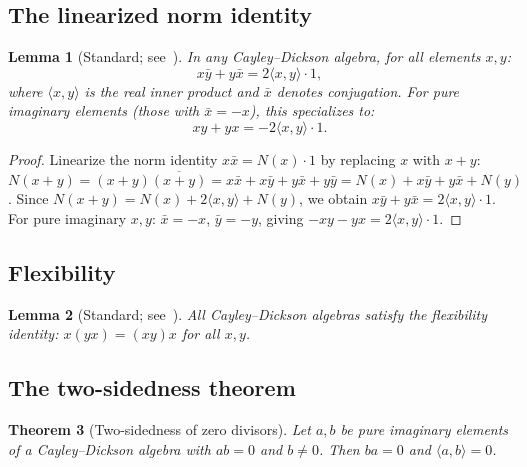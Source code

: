 \documentclass[12pt,a4paper]{article}
\newtheorem{theorem}{Theorem}[section]
\newtheorem{lemma}[theorem]{Lemma}
\theoremstyle{definition}
\theoremstyle{remark}
\begin{document}
\subsection{The linearized norm identity}

\begin{lemma}[Standard; see~\cite{Schafer1966}]
\label{lem:linearized-norm}
In any Cayley--Dickson algebra, for all elements $x, y$:
\[
  x\bar{y} + y\bar{x} = 2\langle x, y \rangle \cdot 1,
\]
where $\langle x, y \rangle$ is the real inner product and
$\bar{x}$ denotes conjugation. For pure imaginary elements
(those with $\bar{x} = -x$), this specializes to:
\begin{equation}
\label{eq:pure-anticommutator}
  xy + yx = -2\langle x, y \rangle \cdot 1.
\end{equation}
\end{lemma}

\begin{proof}
Linearize the norm identity $x\bar{x} = N(x) \cdot 1$ by
replacing $x$ with $x + y$:
$N(x+y) = (x+y)\overline{(x+y)} = x\bar{x} + x\bar{y} +
y\bar{x} + y\bar{y} = N(x) + x\bar{y} + y\bar{x} + N(y)$.
Since $N(x+y) = N(x) + 2\langle x, y \rangle + N(y)$,
we obtain $x\bar{y} + y\bar{x} = 2\langle x, y \rangle \cdot 1$.
For pure imaginary $x, y$: $\bar{x} = -x$, $\bar{y} = -y$,
giving $-xy - yx = 2\langle x, y \rangle \cdot 1$.
\end{proof}

\subsection{Flexibility}

\begin{lemma}[Standard; see~\cite{Schafer1966}]
\label{lem:flexibility}
All Cayley--Dickson algebras satisfy the flexibility identity:
$x(yx) = (xy)x$ for all $x, y$.
\end{lemma}

\subsection{The two-sidedness theorem}

\begin{theorem}[Two-sidedness of zero divisors]
\label{thm:two-sided}
Let $a, b$ be pure imaginary elements of a Cayley--Dickson algebra
with $ab = 0$ and $b \neq 0$. Then $ba = 0$ and
$\langle a, b \rangle = 0$.
\end{theorem}
\end{document}
